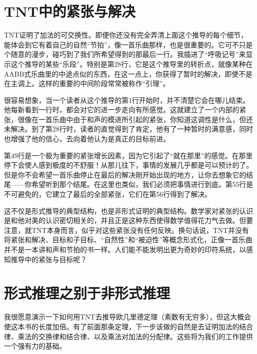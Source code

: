 \section{TNT中的紧张与解决}

TNT证明了加法的可交换性。即便你还没有完全弄清上面这个推导的每个细节，能体会到它有着自己的自然“节拍”，像一首乐曲那样，也是很重要的。它可不只是个随意的漫步，碰巧到了我们所希望得到的那最后一行。我插进了“呼吸记号”来显示这个推导的某些“乐段”。特别是第28行，它是这个推导里的转折点，就像某种在AABB式乐曲里的中途点似的东西，在这一点上，你获得了暂时的解决，即使不是在主调上。这样的重要的中间阶段常常被称作“引理”。

很容易想象，当一个读者从这个推导的第1行开始时，并不清楚它会在哪儿结束。他每新看到一行时，都会对它的进一步走向有所感觉。这就建立了一个内部的紧张，很像在一首乐曲中由于和声的模进所引起的紧张，你知道这调性是什么，但还未解决。到了第28行时，读者的直觉得到了肯定，他有了一种暂时的满意感，同时也增强了他的信心，去向着他认为是真正的目标前进。

第49行是一个极为重要的紧张增长因素，因为它引起了“就在那里”的感觉。在那里停下会使人感到极度的不舒服！从那儿往下，事情的发展几乎都是可以预计的了。但是你不会希望一首乐曲停止在最后的解决刚开始出现的地方，让你去想象它的结尾——你希望听到那个结尾。在这里也类似，我们必须把事情进行到底。第55行是不可避免的，它建立了最后的全部紧张，它们在第56行得到了解决。

这不仅是形式推导的典型结构，也是非形式证明的典型结构。数学家对紧张的认识是和他对美的认识密切相关的，并且正是这种东西使得数学值得花力气去做。但要注意，就TNT本身而言，似乎对这些紧张没有任何反映。换句话说，TNT并没有将紧张和解决、目标和子目标、“自然性”和“被迫性”等概念形式化，正像一首乐曲并不是一本讲和声和节拍的书一样。人们能不能发明出更为奇妙的印符系统，以感知推导中的紧张与目标呢？

\section{形式推理之别于非形式推理}

我很愿意演示一下如何用TNT去推导欧几里德定理（素数有无穷多），但这大概会使这本书的长度加倍。有了前面那条定理，下一步该做的自然是去证明加法的结合律、乘法的交换律和结合律、以及乘法对加法的分配律。这些将为我们的工作提供一个强有力的基础。

